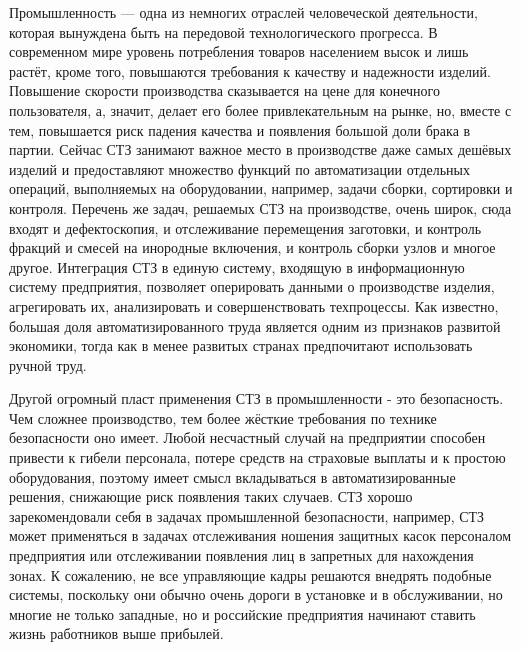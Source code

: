 Промышленность --- одна из немногих отраслей человеческой деятельности, которая вынуждена быть на передовой технологического прогресса. В современном мире уровень потребления товаров населением высок и лишь растёт, кроме того, повышаются требования к качеству и надежности изделий. Повышение скорости производства сказывается на цене для конечного пользователя, а, значит, делает его более привлекательным на рынке, но, вместе с тем, повышается риск падения качества и появления большой доли брака в партии. Сейчас СТЗ занимают важное место в производстве даже самых дешёвых изделий и предоставляют множество функций по автоматизации отдельных операций, выполняемых на оборудовании, например, задачи сборки, сортировки и контроля. Перечень же задач, решаемых СТЗ на производстве, очень широк, сюда входят и дефектоскопия, и отслеживание перемещения заготовки, и контроль фракций и смесей на инородные включения, и контроль сборки узлов и многое другое. Интеграция СТЗ в единую систему, входящую в информационную систему предприятия, позволяет оперировать данными о производстве изделия, агрегировать их, анализировать и совершенствовать техпроцессы. Как известно, большая доля автоматизированного труда является одним из признаков развитой экономики, тогда как в менее развитых странах предпочитают использовать ручной труд.

Другой огромный пласт применения СТЗ в промышленности - это безопасность. Чем сложнее производство, тем более жёсткие требования по технике безопасности оно имеет. Любой несчастный случай на предприятии способен привести к гибели персонала, потере средств на страховые выплаты и к простою оборудования, поэтому имеет смысл вкладываться в автоматизированные решения, снижающие риск появления таких случаев. СТЗ хорошо зарекомендовали себя в задачах промышленной безопасности, например, СТЗ может применяться в задачах отслеживания ношения защитных касок персоналом предприятия или отслеживании появления лиц в запретных для нахождения зонах. К сожалению, не все управляющие кадры решаются внедрять подобные системы, поскольку они обычно очень дороги в установке и в обслуживании, но многие не только западные, но и российские предприятия начинают ставить жизнь работников выше прибылей.

